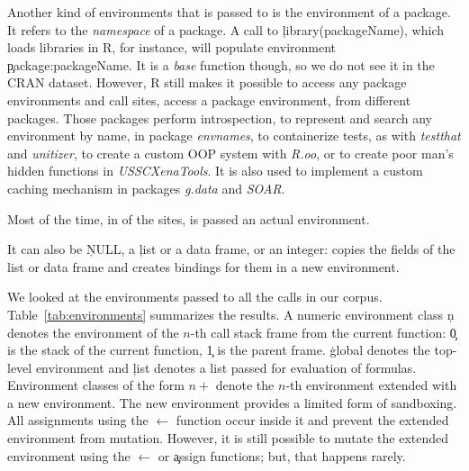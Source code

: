 \documentclass[screen,acmsmall]{acmart}
\begin{document}
Another kind of environments that is passed to \eval is the environment of a
package. It refers to the \emph{namespace} of a package. A call to
\c{library(packageName)}, which loads libraries in R, for instance, will
populate environment \c{package:packageName}. It is a \emph{base} function
though, so we do not see it in the CRAN dataset. However, R still makes it
possible to access any package environments and \packageNbPackageEnvSites call
sites, \ie \packagePackageEnvSitePercent access a package environment, from
\packageNbPackageEnvPackages different packages. Those packages perform
introspection, to represent and search any environment by name, in package
\emph{envnames}, to containerize tests, as with \emph{testthat} and
\emph{unitizer}, to create a custom OOP system with \emph{R.oo}, or to create
poor man's hidden functions in \emph{USSCXenaTools}. It is also used to
implement a custom caching mechanism in packages \emph{g.data} and \emph{SOAR}.



Most of the time, \ie in \packageEnvirEnvSitePercent of the sites, \eval is
passed an actual environment.

It can also be \c{NULL}, a \c{list} or a data frame, or an integer: \eval copies the fields of the
list or data frame and creates bindings for them in a new environment.


We looked at the environments passed to all the \eval calls in our corpus.
Table~\ref{tab:environments} summarizes the results. A numeric environment class
\c{n} denotes the environment of the $n$-th call stack frame from the current
function: \c{0} is the stack of the current function, \c{1} is the parent frame. \c{global} denotes the top-level environment and \c{list} denotes a
list passed for evaluation of formulas. Environment classes of the form $n+$
denote the $n$-th environment extended with a new environment. The new
environment provides a limited form of sandboxing. All assignments using the
$\leftarrow$ function occur inside it and prevent the extended environment from
mutation. However, it is still possible to mutate the extended environment using
the $\leftarrow$ or \c{assign} functions; but, that happens rarely.
\end{document}
